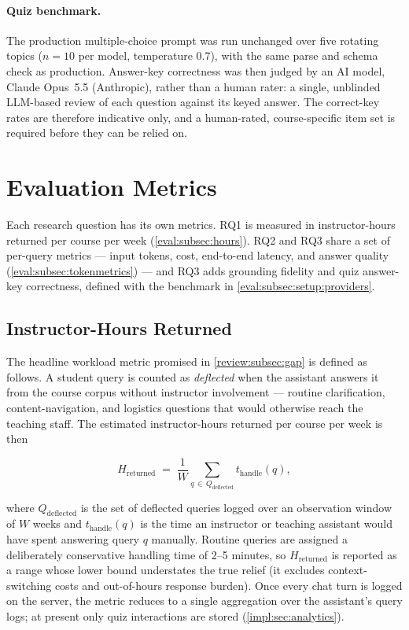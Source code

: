 \paragraph{Quiz benchmark.} The production multiple-choice prompt was run
unchanged over five rotating topics ($n=10$ per model, temperature 0.7),
with the same parse and schema check as production. Answer-key correctness
was then judged by an AI model, Claude Opus~5.5 (Anthropic), rather than
a human rater: a single, unblinded LLM-based review of each question
against its keyed answer. The
correct-key rates are therefore indicative only, and a human-rated,
course-specific item set is required before they can be relied on.

\section{Evaluation Metrics}
\label{eval:sec:metrics}

Each research question has its own metrics. RQ1 is measured in
instructor-hours returned per course per week
(\autoref{eval:subsec:hours}). RQ2 and RQ3 share a set of per-query metrics
--- input tokens, cost, end-to-end latency, and answer quality
(\autoref{eval:subsec:tokenmetrics}) --- and RQ3 adds grounding fidelity and
quiz answer-key correctness, defined with the benchmark in
\autoref{eval:subsec:setup:providers}.

\subsection{Instructor-Hours Returned}
\label{eval:subsec:hours}

The headline workload metric promised in \autoref{review:subsec:gap} is
defined as follows. A student query is counted as \emph{deflected} when the
assistant answers it from the course corpus without instructor involvement
--- routine clarification, content-navigation, and logistics questions that
would otherwise reach the teaching staff. The estimated instructor-hours
returned per course per week is then

\begin{equation}
  \label{eval:eq:hours}
  H_{\mathrm{returned}}
    \;=\;
  \frac{1}{W} \sum_{q \,\in\, Q_{\mathrm{deflected}}} t_{\mathrm{handle}}(q),
\end{equation}

where $Q_{\mathrm{deflected}}$ is the set of deflected queries logged over an
observation window of $W$ weeks and $t_{\mathrm{handle}}(q)$ is the time an
instructor or teaching assistant would have spent answering query $q$
manually. Routine queries are assigned a deliberately conservative handling
time of 2--5 minutes, so $H_{\mathrm{returned}}$ is reported as a range whose
lower bound understates the true relief (it excludes context-switching costs
and out-of-hours response burden). Once every chat turn is logged on the server,
the metric reduces to a single aggregation over the assistant's query logs;
at present only quiz interactions are stored (\autoref{impl:sec:analytics}).

